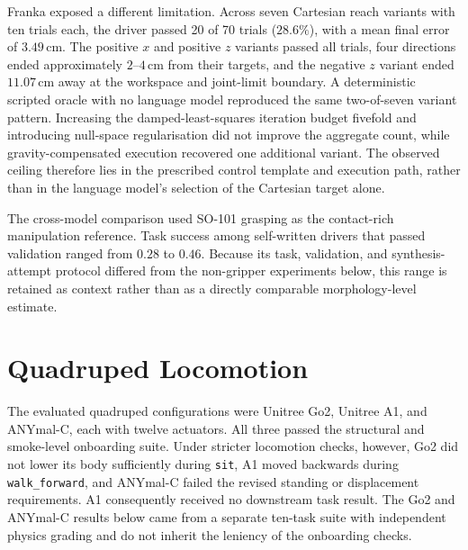 Franka exposed a different limitation. Across seven Cartesian reach variants
with ten trials each, the driver passed 20 of 70 trials ($28.6\%$), with a
mean final error of $3.49$\,cm. The positive $x$ and positive $z$ variants
passed all trials, four directions ended approximately $2$--$4$\,cm from
their targets, and the negative $z$ variant ended $11.07$\,cm away at the
workspace and joint-limit boundary. A deterministic scripted oracle with no
language model reproduced the same two-of-seven variant pattern. Increasing
the damped-least-squares iteration budget fivefold and introducing null-space
regularisation did not improve the aggregate count, while
gravity-compensated execution recovered one additional variant. The observed
ceiling therefore lies in the prescribed control template and execution path,
rather than in the language model's selection of the Cartesian target alone.

The cross-model comparison used SO-101 grasping as the contact-rich
manipulation reference. Task success among self-written drivers that passed
validation ranged from $0.28$ to $0.46$.
Because its task, validation, and synthesis-attempt protocol differed from the
non-gripper experiments below, this range is retained as context rather than
as a directly comparable morphology-level estimate.


\section[Quadruped Locomotion]{Quadruped Locomotion}
\label{sec:cross-robot-quadrupeds}

The evaluated quadruped configurations were Unitree Go2, Unitree A1, and
ANYmal-C, each with twelve actuators. All three passed the structural and
smoke-level onboarding suite. Under stricter locomotion checks, however, Go2
did not lower its body sufficiently during
\texttt{sit}, A1 moved backwards during \texttt{walk\_forward}, and ANYmal-C
failed the revised standing or displacement requirements. A1 consequently
received no downstream task result. The Go2 and ANYmal-C results below came
from a separate ten-task suite with independent physics grading and do not
inherit the leniency of the onboarding checks.

